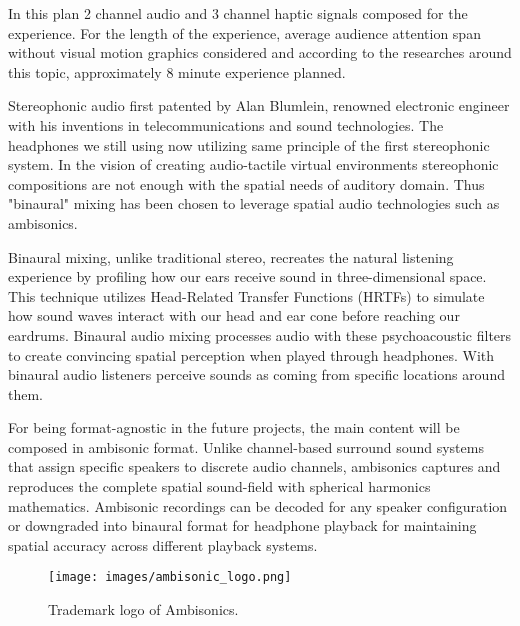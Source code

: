             In this plan 2 channel audio and 3 channel haptic signals composed for the experience. For the length of the experience, average audience attention span without visual motion graphics considered and according to the researches around this topic\cite{UX_Interactive_Media}, approximately 8 minute experience planned.\par

            Stereophonic audio first patented by Alan Blumlein, renowned electronic engineer with his inventions in telecommunications and sound technologies\cite{Alan_Blumlein_and_the_Invention_of_Stereo}. The headphones we still using now utilizing same principle of the first stereophonic system. In the vision of creating audio-tactile virtual environments stereophonic compositions are not enough with the spatial needs of auditory domain. Thus "binaural" mixing has been chosen to leverage spatial audio technologies such as ambisonics.\par

            Binaural mixing, unlike traditional stereo, recreates the natural listening experience by profiling how our ears receive sound in three-dimensional space. This technique utilizes Head-Related Transfer Functions (HRTFs) to simulate how sound waves interact with our head and ear cone before reaching our eardrums. Binaural audio mixing processes audio with these psychoacoustic filters to create convincing spatial perception when played through headphones. With binaural audio listeners perceive sounds as coming from specific locations around them\cite{3D_Audio_and_Acoustic_Environment_Modeling}\cite{3D_Audio}.\par

            For being format-agnostic in the future projects, the main content will be composed in ambisonic format. Unlike channel-based surround sound systems that assign specific speakers to discrete audio channels, ambisonics captures and reproduces the complete spatial sound-field with spherical harmonics mathematics. Ambisonic recordings can be decoded for any speaker configuration or downgraded into binaural format for headphone playback for maintaining spatial accuracy across different playback systems\cite{Ambisonics}.\par

            \begin{figure}[H]
                \centering
                \texttt{[image: images/ambisonic\_logo.png]}
                \caption{Trademark logo of Ambisonics.}
                \label{fig:AMBISONICS}
            \end{figure}

